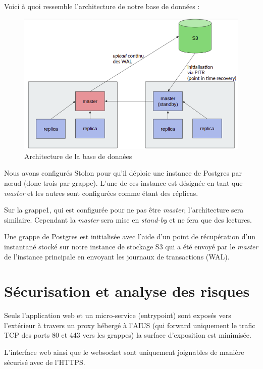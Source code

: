 Voici à quoi ressemble l'architecture de notre base de données :

\begin{figure}[h]
  \caption{\label{db-arch} Architecture de la base de données}
  \includegraphics[width=15cm]{images/database-arch}
\end{figure}

Nous avons configurés Stolon pour qu'il déploie une instance de Postgres
par nœud (donc trois par grappe). L'une de ces instance est désignée en
tant que \textit{master} et les autres sont configurées comme étant des
réplicas.

Sur la grappe1, qui est configurée pour ne pas être \textit{master},
l'architecture sera similaire. Cependant la \textit{master} sera mise en
\textit{stand-by} et ne fera que des lectures.

Une grappe de Postgres est initialisée avec l'aide d'un point de
récupération d'un instantané stocké sur notre instance de stockage S3
qui a été envoyé par le \textit{master} de l'instance principale en
envoyant les journaux de transactions (WAL).

\section{Sécurisation et analyse des risques}

Seuls l'application web et un micro-service (entrypoint) sont exposés
vers l'extérieur à travers un proxy hébergé à l'AIUS (qui forward
uniquement le trafic TCP des ports 80 et 443 vers les grappes) la
surface d'exposition est minimisée.

L'interface web ainsi que le websocket sont uniquement joignables de
manière sécurisé avec de l'HTTPS.

